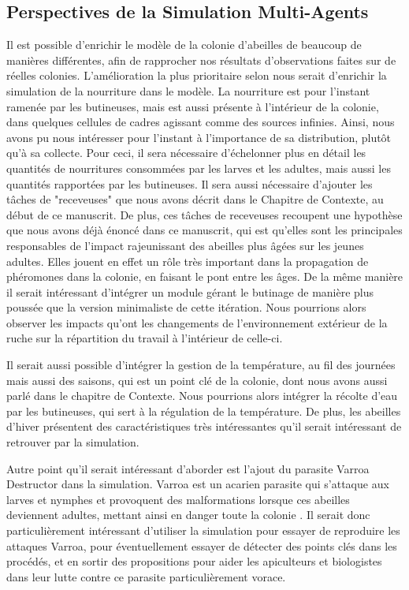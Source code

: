 	\subsection{Perspectives de la Simulation Multi-Agents}
	Il est possible d'enrichir le modèle de la colonie d'abeilles de beaucoup de manières différentes, afin de rapprocher nos résultats d'observations faites sur de réelles colonies. L'amélioration la plus prioritaire selon nous serait d'enrichir la simulation de la nourriture dans le modèle. La nourriture est pour l'instant ramenée par les butineuses, mais est aussi présente à l'intérieur de la colonie, dans quelques cellules de cadres agissant comme des sources infinies. Ainsi, nous avons pu nous intéresser pour l'instant à l'importance de sa distribution, plutôt qu'à sa collecte. Pour ceci, il sera nécessaire d'échelonner plus en détail les quantités de nourritures consommées par les larves et les adultes, mais aussi les quantités rapportées par les butineuses. Il sera aussi nécessaire d'ajouter les tâches de "receveuses" que nous avons décrit dans le Chapitre de Contexte, au début de ce manuscrit. De plus, ces tâches de receveuses recoupent une hypothèse que nous avons déjà énoncé dans ce manuscrit, qui est qu'elles sont les principales responsables de l'impact rajeunissant des abeilles plus âgées sur les jeunes adultes. Elles jouent en effet un rôle très important dans la propagation de phéromones dans la colonie, en faisant le pont entre les âges. De la même manière il serait intéressant d'intégrer un module gérant le butinage de manière plus poussée que la version minimaliste de cette itération. Nous pourrions alors observer les impacts qu'ont les changements de l'environnement extérieur de la ruche sur la répartition du travail à l'intérieur de celle-ci.
	
	Il serait aussi possible d'intégrer la gestion de la température, au fil des journées mais aussi des saisons, qui est un point clé de la colonie, dont nous avons aussi parlé dans le chapitre de Contexte. Nous pourrions alors intégrer la récolte d'eau par les butineuses, qui sert à la régulation de la température. De plus, les abeilles d'hiver présentent des caractéristiques très intéressantes qu'il serait intéressant de retrouver par la simulation. 
	
	Autre point qu'il serait intéressant d'aborder est l'ajout du parasite Varroa Destructor dans la simulation. Varroa est un acarien parasite qui s'attaque aux larves et nymphes et provoquent des malformations lorsque ces abeilles deviennent adultes, mettant ainsi en danger toute la colonie \cite{le_conte_varroa_2010}. Il serait donc particulièrement intéressant d'utiliser la simulation pour essayer de reproduire les attaques Varroa, pour éventuellement essayer de détecter des points clés dans les procédés, et en sortir des propositions pour aider les apiculteurs et biologistes dans leur lutte contre ce parasite particulièrement vorace.
	
